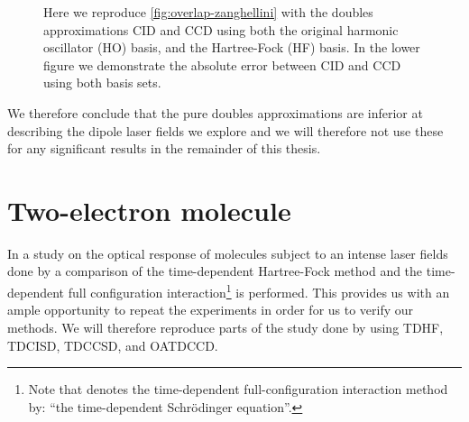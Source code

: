 \begin{figure}
            \caption{Here we reproduce \autoref{fig:overlap-zanghellini} with
            the doubles approximations CID and CCD using both the original
            harmonic oscillator (HO) basis, and the Hartree-Fock (HF) basis.
            In the lower figure we demonstrate the absolute error between CID
            and CCD using both basis sets.}
            \label{fig:overlap-doubles-zanghellini}
        \end{figure}

        We therefore conclude that the pure doubles approximations are inferior
        at describing the dipole laser fields we explore and we will therefore
        not use these for any significant results in the remainder of this
        thesis.



    \section{Two-electron molecule}
        \label{sec:li}
        In a study on the optical response of molecules subject to an
        intense laser fields done by \citeauthor{li_2005} \cite{li_2005} a
        comparison of the time-dependent Hartree-Fock method and the
        time-dependent full configuration interaction\footnote{%
            Note that \citeauthor{li_2005} denotes the time-dependent
            full-configuration interaction method by: ``the time-dependent
            Schrödinger equation''.
        } is performed.
        This provides us with an ample opportunity to repeat the
        experiments in order for us to verify our methods.
        We will therefore reproduce parts of the study done by
        \citeauthor{li_2005} using TDHF, TDCISD, TDCCSD, and OATDCCD.

